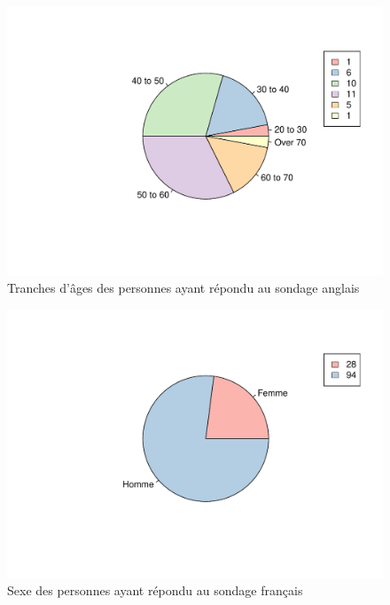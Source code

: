 \documentclass[12pt]{article}\usepackage[]{graphicx}\usepackage[]{color}
\makeatletter
\def\maxwidth{ %
  \ifdim\Gin@nat@width>\linewidth
    \linewidth
  \else
    \Gin@nat@width
  \fi
}
\newenvironment{knitrout}{}{} %
\makeatother
\begin{document}
\begin{knitrout}
\color{fgcolor}\begin{figure}[H]
\includegraphics[width=\maxwidth]{figure/tranche_age_en-1} \caption[Tranches d'âges des personnes ayant répondu au sondage anglais]{Tranches d'âges des personnes ayant répondu au sondage anglais}\label{fig:tranche age en}
\end{figure}


\end{knitrout}

\begin{knitrout}
\color{fgcolor}\begin{figure}[H]
\includegraphics[width=\maxwidth]{figure/sexe_fr-1} \caption[Sexe des personnes ayant répondu au sondage français]{Sexe des personnes ayant répondu au sondage français}\label{fig:sexe fr}
\end{figure}


\end{knitrout}
\end{document}
